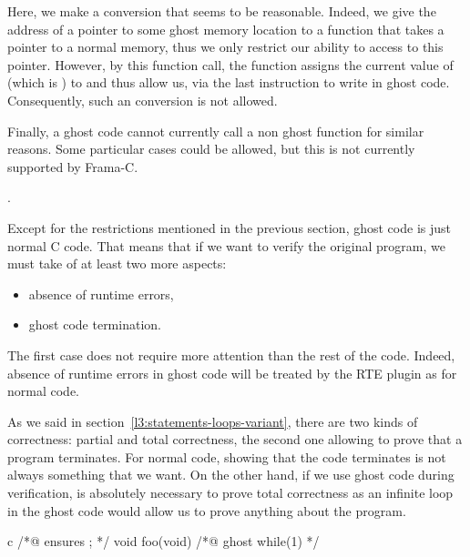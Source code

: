 

Here, we make a conversion that seems to be reasonable. Indeed, we give
the address of a pointer to some ghost memory location to a function
that takes a pointer to a normal memory, thus we only restrict our ability
to access to this pointer. However, by this function call, the function
 assigns the current value of  (which is
) to  and thus allow us, via the last
instruction to write  in ghost code. Consequently, such an
conversion is not allowed.


Finally, a ghost code cannot currently call a non ghost function for
similar reasons. Some particular cases could be allowed, but this is
not currently supported by Frama-C.


\label{l3:acsl-logic-definitions-what-remains}.


Except for the restrictions mentioned in the previous section,
ghost code is just normal C code. That means that if we want to
verify the original program, we must take of at least two more
aspects:


\begin{itemize}
\item absence of runtime errors,
\item ghost code termination.
\end{itemize}


The first case does not require more attention than the rest of the
code. Indeed, absence of runtime errors in ghost code will be treated
by the RTE plugin as for normal code.


As we said in section~\ref{l3:statements-loops-variant}, there are two
kinds of correctness: partial and total correctness, the second one allowing
to prove that a program terminates. For normal code, showing that the code
terminates is not always something that we want. On the other hand, if we
use ghost code during verification, is absolutely necessary to prove total
correctness as an infinite loop in the ghost code would allow us to prove
anything about the program.


\begin{CodeBlock}{c}
/*@ ensures \false ; */
void foo(void){
  /*@ ghost
    while(1){}
  */
}
\end{CodeBlock}





